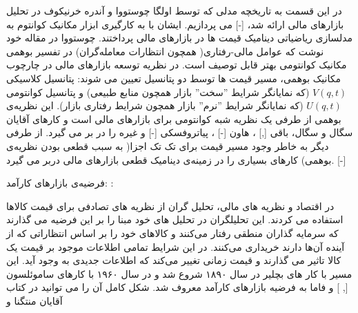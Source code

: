 \documentclass[a4paper,titlepage,12pt,fleqn,oneside]{report}
\begin{document}
	در این قسمت به تاریخچه مدلی که توسط اولگا چوستووا و آندره خرنیکوف در تحلیل بازارهای مالی ارائه شد، [-] می پردازیم.  ایشان با به کارگیری ابزار مکانیک کوانتوم به مدلسازی ریاضیاتی دینامیک قیمت ها در بازارهای مالی پرداختند. چوستووا در مقاله خود نوشت که عوامل مالی-رفتاری( همچون انتظارات معامله‌گران)  در تفسیر بوهمی مکانیک کوانتومی بهتر قابل توصیف است.  در نظریه توسعه بازارهای مالی در چارچوب مکانیک بوهمی،  مسیر قیمت ها توسط دو پتانسیل تعیین می شوند: پتانسیل کلاسیکی
	$V(q,t)$
	(که نمایانگر شرایط ''سخت'' بازار همچون منابع طبیعی) و پتانسیل کوانتومی
	$U(q,t)$
	(که نمایانگر شرایط ''نرم'' بازار همچون شرایط رفتاری بازار).  این نظریه‌ی بوهمی از طرفی یک نظریه شبه کوانتومی برای بازارهای مالی است و کارهای آقایان سگال و سگال\cite{seg}،
	باقی [,]
	، هاون [-]
	، پیاتروفسکی [-]
	و غیره  را در بر می گیرد.  از طرفی دیگر به خاطر وجود مسیر قیمت برای تک تک اجزا( به سبب
	قطعی بودن نظریه‌ی بوهمی) کارهای بسیاری را در زمینه‌ی دینامیک قطعی بازارهای مالی دربر می گیرد.  [-]
	
	فرضیه‌ی بازارهای کارآمد:
	:
	
	
	در اقتصاد و نظریه های مالی،  تحلیل گران از نظریه های تصادفی برای قیمت کالاها استفاده می کردند.  این تحلیلگران در تحلیل های خود مبنا را بر این فرضیه می گذارند که سرمایه گذاران منطقی رفتار می‌کنند و کالاهای خود را بر اساس انتظاراتی که از آینده آن‌ها دارند خریداری می‌کنند.  در این شرایط تمامی اطلاعات موجود بر قیمت یک کالا تاثیر می گذارند و قیمت زمانی تغییر می‌کند که اطلاعات جدیدی به وجود آید.  این مسیر با کار های بچلیر \cite{bac} در سال ۱۸۹۰  شروع شد و در سال ۱۹۶۰ با کارهای ساموئلسون [, ] و فاما \cite{fama} به فرضیه بازارهای کارآمد معروف شد.  شکل کامل آن را می توانید در کتاب آقایان منتگنا و 
	
\end{document}
